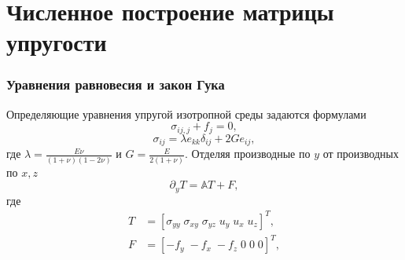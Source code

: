 \section{Численное построение матрицы упругости}
\begin{frame}
    \frametitle{Уравнения равновесия и закон Гука}
    Определяющие уравнения упругой изотропной среды задаются формулами
    \begin{equation}
        \label{eq:equilibrium}
        \sigma_{ij,j} + f_j = 0,
    \end{equation}
    \begin{equation}		
        \sigma_{ij} = \lambda e_{kk}\delta_{ij} + 2G e_{ij},
        \label{eq:hooke_law}
    \end{equation}
    где $\lambda = \frac{E \nu}{(1+\nu)(1-2\nu)}$ и $ G = \frac{E}{2(1+\nu)} $.
    Отделяя производные по $y$ от производных по $x, z$
    \begin{equation}
        \label{eq:separate}
        \partial_{y} T = \mathbb{A}T + F,
    \end{equation}
    где
    \begin{equation}
        \label{eq:T}
        \begin{split}
            T &= \left[\sigma_{yy} \; \sigma_{xy} \; \sigma_{yz} \; u_{y} \; u_{x} \; u_{z}\right]^T, \\
            F &= \left[-f_y \; -f_x \; -f_z \; 0 \; 0 \; 0\right]^T,
        \end{split}
    \end{equation}
\end{frame}

